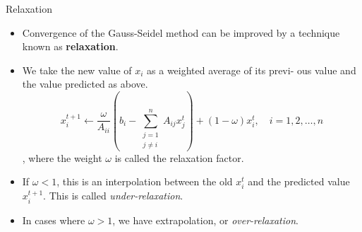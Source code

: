 \documentclass{beamer}
\begin{document}
\begin{frame}{Relaxation}
    \begin{itemize}
        \item Convergence of the Gauss-Seidel method can be improved by a technique known
        as \textbf{relaxation}.
        \item We take the  new value of $x_i$ as a weighted average of its previ-
        ous value and the value predicted as above. 
$$
x_i^{t+1} \leftarrow \frac{\omega}{A_{i i}}\left(b_i-\sum_{\substack{j=1 \\ j \neq i}}^n A_{i j} x_j^t\right)+(1-\omega) x_i^t, \quad i=1,2, \ldots, n
$$,
where the weight $\omega$ is called the relaxation factor. 
\item  If $\omega <1$, this is an interpolation between the old $x_i^t$ and the predicted value $x_i^{t+1}$. 
This is called \emph{under-relaxation}.
\item In cases where $\omega > 1$, we have extrapolation, or \emph{over-relaxation}.
    \end{itemize}

\end{frame}
\end{document}
